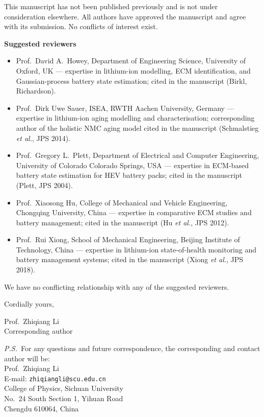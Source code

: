 \documentclass[12pt]{article}
\begin{document}
This manuscript has not been published previously and is not under consideration elsewhere.
All authors have approved the manuscript and agree with its submission.
No conflicts of interest exist.

\bigskip
\noindent\textbf{Suggested reviewers}
\begin{itemize}
    \item Prof.\ David A.\ Howey, Department of Engineering Science, University of Oxford, UK --- expertise in lithium-ion modelling, ECM identification, and Gaussian-process battery state estimation; cited in the manuscript (Birkl, Richardson).
    \item Prof.\ Dirk Uwe Sauer, ISEA, RWTH Aachen University, Germany --- expertise in lithium-ion aging modelling and characterisation; corresponding author of the holistic NMC aging model cited in the manuscript (Schmalstieg \emph{et al.}, JPS 2014).
    \item Prof.\ Gregory L.\ Plett, Department of Electrical and Computer Engineering, University of Colorado Colorado Springs, USA --- expertise in ECM-based battery state estimation for HEV battery packs; cited in the manuscript (Plett, JPS 2004).
    \item Prof.\ Xiaosong Hu, College of Mechanical and Vehicle Engineering, Chongqing University, China --- expertise in comparative ECM studies and battery management; cited in the manuscript (Hu \emph{et al.}, JPS 2012).
    \item Prof.\ Rui Xiong, School of Mechanical Engineering, Beijing Institute of Technology, China --- expertise in lithium-ion state-of-health monitoring and battery management systems; cited in the manuscript (Xiong \emph{et al.}, JPS 2018).
\end{itemize}
We have no conflicting relationship with any of the suggested reviewers.

\bigskip
\noindent Cordially yours,

\medskip
\noindent Prof.\ Zhiqiang Li\\
Corresponding author

\bigskip
\noindent\textit{P.S.}\ For any questions and future correspondence, the corresponding and contact author will be:\\
Prof.\ Zhiqiang Li\\
E-mail: \texttt{zhiqiangli@scu.edu.cn}\\
College of Physics, Sichuan University\\
No.\ 24 South Section 1, Yihuan Road\\
Chengdu 610064, China
\end{document}
